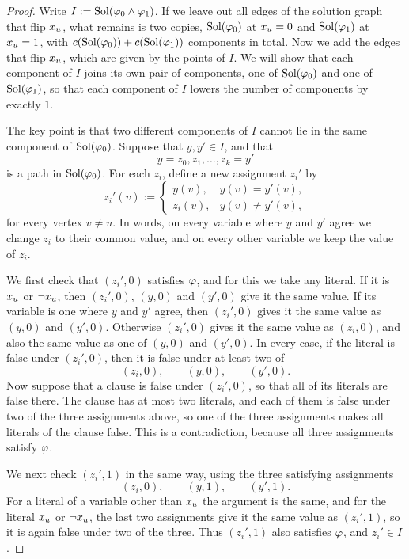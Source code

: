 \begin{proof}
Write \(I:=\operatorname{Sol}(\varphi_0\wedge\varphi_1)\). If we leave out all edges of the solution
graph that flip \(x_{u}\), what remains is two copies, \(\operatorname{Sol}(\varphi_0)\) at
\(x_{u}=0\) and \(\operatorname{Sol}(\varphi_1)\) at \(x_{u}=1\), with
\(c(\operatorname{Sol}(\varphi_0))+c(\operatorname{Sol}(\varphi_1))\) components in total. Now we add the edges
that flip \(x_{u}\), which are given by the points of \(I\). We will show
that each component of \(I\) joins its own pair of components, one of
\(\operatorname{Sol}(\varphi_0)\) and one of \(\operatorname{Sol}(\varphi_1)\), so that each component of \(I\)
lowers the number of components by exactly \(1\).

The key point is that two different components of \(I\) cannot lie in the same
component of \(\operatorname{Sol}(\varphi_0)\). Suppose that \(y,y'\in I\), and that
\[
  y=z_0,z_1,\ldots,z_k=y'
\]
is a path in \(\operatorname{Sol}(\varphi_0)\). For each \(z_i\), define a new assignment
\(z_i'\) by
\[
  z_i'(v):=
  \begin{cases}
    y(v),&y(v)=y'(v),\\
    z_i(v),&y(v)\ne y'(v),
  \end{cases}
\]
for every vertex \(v\ne u\). In words, on every variable where \(y\) and \(y'\)
agree we change \(z_i\) to their common value, and on every other variable we
keep the value of \(z_i\).

We first check that \((z_i',0)\) satisfies \(\varphi\), and for this we take any
literal. If it is \(x_{u}\) or \(\neg x_{u}\), then \((z_i',0)\), \((y,0)\)
and \((y',0)\) give it the same value. If its variable is one where \(y\) and
\(y'\) agree, then \((z_i',0)\) gives it the same value as \((y,0)\) and
\((y',0)\). Otherwise \((z_i',0)\) gives it the same value as \((z_i,0)\), and
also the same value as one of \((y,0)\) and \((y',0)\). In every case, if the
literal is false under \((z_i',0)\), then it is false under at least two of
\[
  (z_i,0),\qquad (y,0),\qquad (y',0).
\]
Now suppose that a clause is false under \((z_i',0)\), so that all of its
literals are false there. The clause has at most two literals, and each of them
is false under two of the three assignments above, so one of the three
assignments makes all literals of the clause false. This is a contradiction,
because all three assignments satisfy \(\varphi\).

We next check \((z_i',1)\) in the same way, using the three satisfying
assignments
\[
  (z_i,0),\qquad (y,1),\qquad (y',1).
\]
For a literal of a variable other than \(x_{u}\) the argument is the same,
and for the literal \(x_{u}\) or \(\neg x_{u}\), the last two assignments
give it the same value as \((z_i',1)\), so it is again false under two of the
three. Thus \((z_i',1)\) also satisfies \(\varphi\), and \(z_i'\in I\).


\end{proof}
